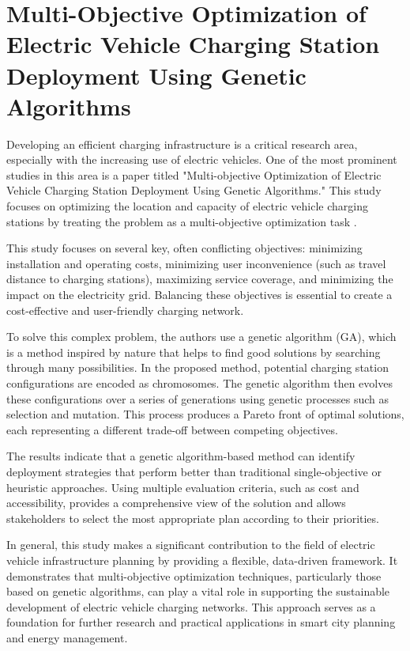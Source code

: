 

\section{Multi-Objective Optimization of Electric Vehicle Charging Station Deployment Using Genetic Algorithms}
Developing an efficient charging infrastructure is a critical research area, especially with the increasing use of electric vehicles. One of the most prominent studies in this area is a paper titled "Multi-objective Optimization of Electric Vehicle Charging Station Deployment Using Genetic Algorithms." This study focuses on optimizing the location and capacity of electric vehicle charging stations by treating the problem as a multi-objective optimization task \cite{Multi-objective optimization of electric vehicle charging station deployment using genetic algorithms}.

This study focuses on several key, often conflicting objectives: minimizing installation and operating costs, minimizing user inconvenience (such as travel distance to charging stations), maximizing service coverage, and minimizing the impact on the electricity grid. Balancing these objectives is essential to create a cost-effective and user-friendly charging network\cite{Multi-objective optimization of electric vehicle charging station deployment using genetic algorithms}.

To solve this complex problem, the authors use a genetic algorithm (GA), which is a method inspired by nature that helps to find good solutions by searching through many possibilities. In the proposed method, potential charging station configurations are encoded as chromosomes. The genetic algorithm then evolves these configurations over a series of generations using genetic processes such as selection and mutation. This process produces a Pareto front of optimal solutions, each representing a different trade-off between competing objectives\cite{Multi-objective optimization of electric vehicle charging station deployment using genetic algorithms}.

The results indicate that a genetic algorithm-based method can identify deployment strategies that perform better than traditional single-objective or heuristic approaches. Using multiple evaluation criteria, such as cost and accessibility, provides a comprehensive view of the solution and allows stakeholders to select the most appropriate plan according to their priorities\cite{Multi-objective optimization of electric vehicle charging station deployment using genetic algorithms}.

In general, this study makes a significant contribution to the field of electric vehicle infrastructure planning by providing a flexible, data-driven framework. It demonstrates that multi-objective optimization techniques, particularly those based on genetic algorithms, can play a vital role in supporting the sustainable development of electric vehicle charging networks. This approach serves as a foundation for further research and practical applications in smart city planning and energy management\cite{Multi-objective optimization of electric vehicle charging station deployment using genetic algorithms}.

